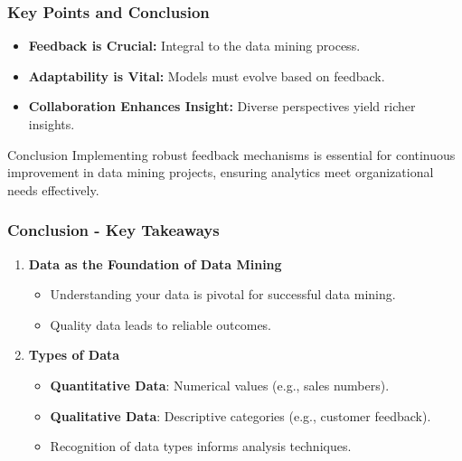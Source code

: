 \documentclass[aspectratio=169]{beamer}
\begin{document}
\begin{frame}[fragile]
    \frametitle{Key Points and Conclusion}
    \begin{itemize}
        \item \textbf{Feedback is Crucial:} Integral to the data mining process.
        \item \textbf{Adaptability is Vital:} Models must evolve based on feedback.
        \item \textbf{Collaboration Enhances Insight:} Diverse perspectives yield richer insights.
    \end{itemize}
    \begin{block}{Conclusion}
        Implementing robust feedback mechanisms is essential for continuous improvement in data mining projects, ensuring analytics meet organizational needs effectively.
    \end{block}
\end{frame}

\begin{frame}[fragile]
    \frametitle{Conclusion - Key Takeaways}
    \begin{enumerate}
        \item \textbf{Data as the Foundation of Data Mining}
        \begin{itemize}
            \item Understanding your data is pivotal for successful data mining.
            \item Quality data leads to reliable outcomes.
        \end{itemize}
        
        \item \textbf{Types of Data}
        \begin{itemize}
            \item \textbf{Quantitative Data}: Numerical values (e.g., sales numbers).
            \item \textbf{Qualitative Data}: Descriptive categories (e.g., customer feedback).
            \item Recognition of data types informs analysis techniques.
        \end{itemize}
    \end{enumerate}
\end{frame}
\end{document}
